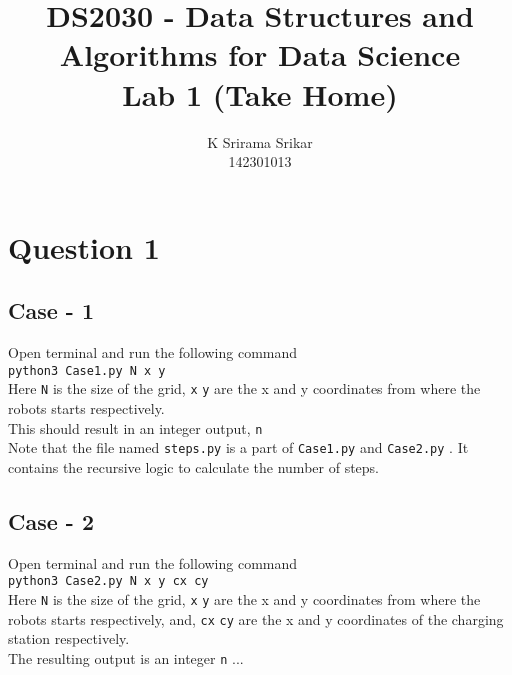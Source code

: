\documentclass{article}
\title{\textbf{DS2030 - Data Structures and Algorithms for Data Science \\Lab 1 (Take Home)}}
\author{K Srirama Srikar \\142301013 }
\date{}
\begin{document}
\maketitle
\section{Question 1}
\subsection{Case - 1}
Open terminal and run the following command \\ \texttt{python3 Case1.py N x y} \\  Here \texttt{N} is the size of the grid, \texttt{x} \texttt{y} are the x and y coordinates from where the robots starts respectively.  \\
This should result in an integer output, \texttt{n} \\
Note that the file named \texttt{steps.py} is a part of \texttt{Case1.py} and \texttt{Case2.py} . It contains the recursive logic to calculate the number of steps. \\

\subsection{Case - 2}
Open terminal and run the following command \\ \texttt{python3 Case2.py N x y cx cy} \\  Here \texttt{N} is the size of the grid, \texttt{x} \texttt{y} are the x and y coordinates from where the robots starts respectively, and, \texttt{cx} \texttt{cy} are the x and y coordinates of the charging station respectively.\\ The resulting output is an integer \texttt{n} ... 
\end{document}
